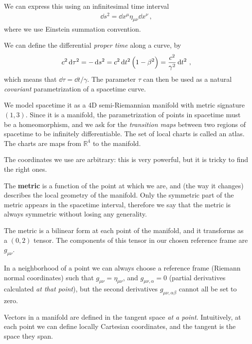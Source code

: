 \documentclass[main.tex]{subfiles}
\begin{document}
We can express this using an infinitesimal time interval  
%
\begin{align}
\dd{s^2} = \dd{x^{\mu }} \eta_{\mu \nu  } \dd{x^{\nu }}
\,,
\end{align}
%
where we use Einstein summation convention. 

We can define the differential \emph{proper time} along a curve, by 
%
\begin{align}
c^2 \dd{\tau^2}  = - \dd{s^2} = c^2 \dd{t^2} \qty(1 - \beta^2) = \frac{c^2}{\gamma^2} \dd{t^2}
\,,
\end{align}
%
which means that \(\dd{\tau } = \dd{t} / \gamma \). 
The parameter \(\tau \) can then be used as a natural \emph{covariant} parametrization of a spacetime curve. 

We model spacetime it as a 4D semi-Riemannian manifold with metric signature \((1, 3)\). 
Since it is a manifold, the parametrization of points in spacetime must be a homeomorphism, and we ask for the \emph{transition maps} between two regions of spacetime to be infinitely differentiable. 
The set of local charts is called an atlas. 
The charts are maps from \(\mathbb{R}^{4}\) to the manifold. 

The coordinates we use are arbitrary: this is very powerful, but it is tricky to find the right ones.

The \textbf{metric} is a function of the point at which we are, and (the way it changes) describes the local geometry of the manifold. 
Only the symmetric part of the  metric appears in the spacetime interval, therefore we say that the metric is always symmetric without losing any generality. 

The metric is a bilinear form at each point of the manifold, and it transforms as a \((0,2)\) tensor. 
The components of this tensor in our chosen reference frame are \(g_{\mu \nu }\). 

In a neighborhood of a point we can always choose a reference frame (Riemann normal coordinates) such that \(g_{\mu \nu } = \eta_{\mu \nu }\), and \(g_{\mu \nu , \alpha } = 0\) (partial derivatives calculated \emph{at that point}), but the second derivatives \(g_{\mu \nu , \alpha \beta }\) cannot all be set to zero. 

Vectors in a manifold are defined in the tangent space \emph{at a point}. 
Intuitively, at each point we can define locally Cartesian coordinates, and the tangent is the space they span. 
\end{document}
